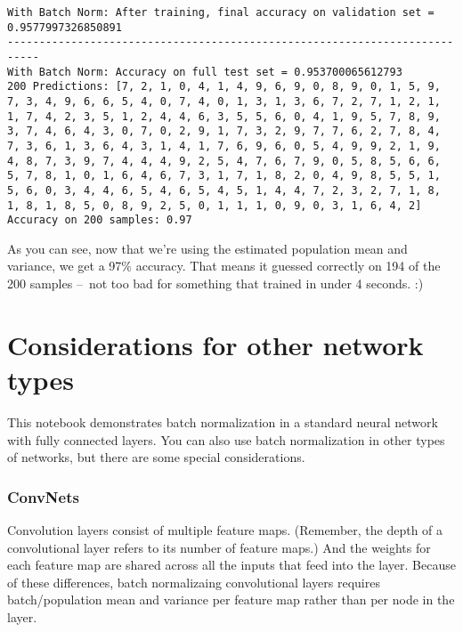 \documentclass[11pt]{article}
\begin{document}
    \begin{Verbatim}[commandchars=\\\{\}]
With Batch Norm: After training, final accuracy on validation set = 0.9577997326850891
---------------------------------------------------------------------------
With Batch Norm: Accuracy on full test set = 0.953700065612793
200 Predictions: [7, 2, 1, 0, 4, 1, 4, 9, 6, 9, 0, 8, 9, 0, 1, 5, 9, 7, 3, 4, 9, 6, 6, 5, 4, 0, 7, 4, 0, 1, 3, 1, 3, 6, 7, 2, 7, 1, 2, 1, 1, 7, 4, 2, 3, 5, 1, 2, 4, 4, 6, 3, 5, 5, 6, 0, 4, 1, 9, 5, 7, 8, 9, 3, 7, 4, 6, 4, 3, 0, 7, 0, 2, 9, 1, 7, 3, 2, 9, 7, 7, 6, 2, 7, 8, 4, 7, 3, 6, 1, 3, 6, 4, 3, 1, 4, 1, 7, 6, 9, 6, 0, 5, 4, 9, 9, 2, 1, 9, 4, 8, 7, 3, 9, 7, 4, 4, 4, 9, 2, 5, 4, 7, 6, 7, 9, 0, 5, 8, 5, 6, 6, 5, 7, 8, 1, 0, 1, 6, 4, 6, 7, 3, 1, 7, 1, 8, 2, 0, 4, 9, 8, 5, 5, 1, 5, 6, 0, 3, 4, 4, 6, 5, 4, 6, 5, 4, 5, 1, 4, 4, 7, 2, 3, 2, 7, 1, 8, 1, 8, 1, 8, 5, 0, 8, 9, 2, 5, 0, 1, 1, 1, 0, 9, 0, 3, 1, 6, 4, 2]
Accuracy on 200 samples: 0.97

    \end{Verbatim}

    As you can see, now that we're using the estimated population mean and
variance, we get a 97\% accuracy. That means it guessed correctly on 194
of the 200 samples --~not too bad for something that trained in under 4
seconds. :)

\hypertarget{considerations-for-other-network-types}{%
\section{Considerations for other network
types}\label{considerations-for-other-network-types}}

This notebook demonstrates batch normalization in a standard neural
network with fully connected layers. You can also use batch
normalization in other types of networks, but there are some special
considerations.

\hypertarget{convnets}{%
\subsubsection{ConvNets}\label{convnets}}

Convolution layers consist of multiple feature maps. (Remember, the
depth of a convolutional layer refers to its number of feature maps.)
And the weights for each feature map are shared across all the inputs
that feed into the layer. Because of these differences, batch
normalizaing convolutional layers requires batch/population mean and
variance per feature map rather than per node in the layer.
\end{document}
